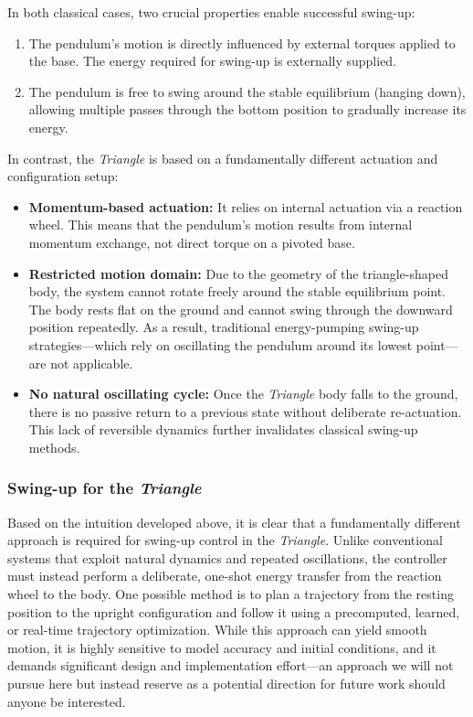 \documentclass{article}
\begin{document}
In both classical cases, two crucial properties enable successful swing-up:

\begin{enumerate}
  \item The pendulum's motion is directly influenced by external torques applied to the base. The energy required for swing-up is externally supplied.
  \item The pendulum is free to swing around the stable equilibrium (hanging down), allowing multiple passes through the bottom position to gradually increase its energy.
\end{enumerate}

In contrast, the \textit{Triangle} is based on a fundamentally different actuation and configuration setup:

\begin{itemize}
  \item \textbf{Momentum-based actuation:} It relies on internal actuation via a reaction wheel. This means that the pendulum's motion results from internal momentum exchange, not direct torque on a pivoted base.

  \item \textbf{Restricted motion domain:} Due to the geometry of the triangle-shaped body, the system cannot rotate freely around the stable equilibrium point. The body rests flat on the ground and cannot swing through the downward position repeatedly. As a result, traditional energy-pumping swing-up strategies—which rely on oscillating the pendulum around its lowest point—are not applicable.

  \item \textbf{No natural oscillating cycle:} Once the \textit{Triangle} body falls to the ground, there is no passive return to a previous state without deliberate re-actuation. This lack of reversible dynamics further invalidates classical swing-up methods.
\end{itemize}

\subsubsection*{Swing-up for the \textit{Triangle}}

Based on the intuition developed above, it is clear that a fundamentally different approach is required for swing-up control in the \textit{Triangle}. Unlike conventional systems that exploit natural dynamics and repeated oscillations, the controller must instead perform a deliberate, one-shot energy transfer from the reaction wheel to the body. One possible method is to plan a trajectory from the resting position to the upright configuration and follow it using a precomputed, learned, or real-time trajectory optimization. While this approach can yield smooth motion, it is highly sensitive to model accuracy and initial conditions, and it demands significant design and implementation effort—an approach we will not pursue here but instead reserve as a potential direction for future work should anyone be interested.
\end{document}
